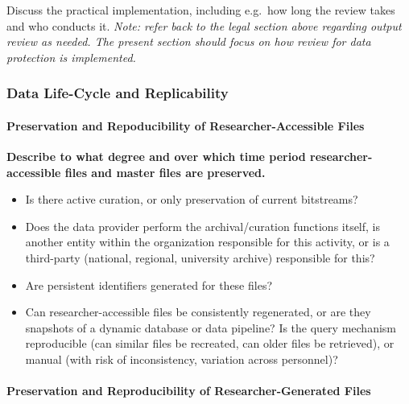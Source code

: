 \documentclass[
]{WileySix}
\providecommand{\tightlist}{%
  \setlength{\itemsep}{0pt}\setlength{\parskip}{0pt}}
\begin{document}
Discuss the practical implementation, including e.g.~how long the review takes and who conducts it. \emph{Note: refer back to the legal section above regarding output review as needed. The present section should focus on how review for data protection is implemented.}

\hypertarget{data-life-cycle-and-replicability-6}{%
\subsubsection*{Data Life-Cycle and Replicability}\label{data-life-cycle-and-replicability-6}}

\hypertarget{preservation-and-repoducibility-of-researcher-accessible-files}{%
\paragraph{Preservation and Repoducibility of Researcher-Accessible Files}\label{preservation-and-repoducibility-of-researcher-accessible-files}}

\textbf{Describe to what degree and over which time period researcher-accessible files and master files are preserved.}

\begin{itemize}
\tightlist
\item
  Is there active curation, or only preservation of current bitstreams?
\item
  Does the data provider perform the archival/curation functions itself, is another entity within the organization responsible for this activity, or is a third-party (national, regional, university archive) responsible for this?
\item
  Are persistent identifiers generated for these files?
\item
  Can researcher-accessible files be consistently regenerated, or are they snapshots of a dynamic database or data pipeline? Is the query mechanism reproducible (can similar files be recreated, can older files be retrieved), or manual (with risk of inconsistency, variation across personnel)?
\end{itemize}

\hypertarget{preservation-and-reproducibility-of-researcher-generated-files-6}{%
\paragraph{Preservation and Reproducibility of Researcher-Generated Files}\label{preservation-and-reproducibility-of-researcher-generated-files-6}}
\end{document}
